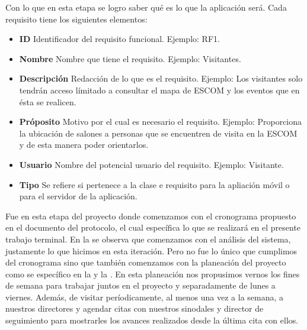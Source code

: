 \noindent
Con lo que en esta etapa se logro saber qué es lo que la aplicación será. Cada requisito tiene los siguientes elementos:
\begin{itemize}
	\item \textbf{ID} Identificador del requisito funcional. Ejemplo: RF1.
	\item \textbf{Nombre} Nombre que tiene el requisito. Ejemplo: Visitantes.
	\item \textbf{Descripción} Redacción de lo que es el requisito. Ejemplo: Los visitantes solo tendrán acceso límitado a consultar el mapa de ESCOM y los eventos que en ésta se realicen.
	\item \textbf{Próposito} Motivo por el cual es necesario el requisito. Ejemplo: Proporciona la ubicación de salones a personas que se encuentren de visita en la ESCOM y de esta manera poder orientarlos.
	\item \textbf{Usuario} Nombre del potencial usuario del requisito. Ejemplo: Visitante.
	\item \textbf{Tipo} Se refiere si pertenece a la clase e requisito para la apliación móvil o para el servidor de la aplicación.
\end{itemize}

\noindent
Fue en esta etapa del proyecto donde comenzamos con el cronograma propuesto en el documento del protocolo, el cual específica lo que se realizará en el presente trabajo terminal. En la  se observa que comenzamos con el análisis del sistema, justamente lo que hicimos en esta iteración. Pero no fue lo único que cumplimos del cronograma sino que también comenzamos con la planeación del proyecto como se específico en la  y la . En esta planeación nos propusimos vernos los fines de semana para trabajar juntos en el proyecto y separadamente de lunes a viernes. Además, de visitar períodicamente, al menos una vez a la semana, a nuestros directores y agendar citas con nuestros sinodales y director de seguimiento para mostrarles los avances realizados desde la última cita con ellos.






